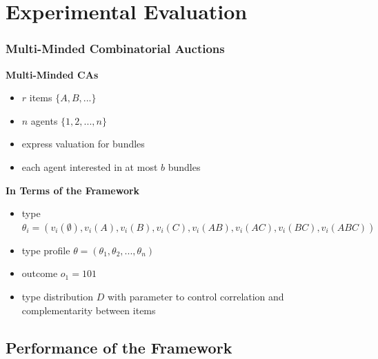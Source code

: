 \documentclass{beamer}
\begin{document}
\section{Experimental Evaluation}
\begin{frame}
	\frametitle{Multi-Minded Combinatorial Auctions}	
	\textbf{Multi-Minded CAs}\\
	{\small
	\begin{itemize}
		\item  $r$ items $\{A, B, ...\}$
	
		\item $n$ agents  $\{1, 2,..., n\}$
	
		\item express valuation for bundles
	
		\item each agent interested in at most $b$ bundles
	\end{itemize}}
	\pause
	\textbf{In Terms of the Framework}\\
	{\small
	\begin{itemize}
		\item type $\theta_{i}=(v_{i}(\emptyset),v_{i}(A),v_{i}(B),v_{i}(C),v_{i}(AB),v_{i}(AC),v_{i}(BC),v_{i}(ABC))$
		
		\item type profile $\theta = (\theta_{1}, \theta_{2}, ..., \theta_{n})$
		
		\item outcome $o_{1} = 101$
		
		\item  type distribution $D$ with parameter to control correlation and complementarity between items
	\end{itemize}}
	
\end{frame}

\subsection{Performance of the Framework}
\end{document}
